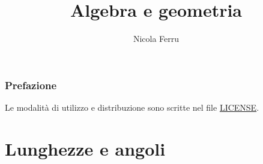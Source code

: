 \documentclass{book}
\title{Algebra e geometria}
\author{Nicola Ferru}
\theoremstyle{definition}
\theoremstyle{plain}
\begin{document}
\maketitle
\tableofcontents

\subsubsection{Prefazione}
\label{sec:pref}
Le modalità di utilizzo e distribuzione sono scritte nel file \href{https://github.com/NF02/Appunti-universita/blob/main/LICENSE}{LICENSE}.


\section{Lunghezze e angoli}
\label{sec:lungeang}
\end{document}
